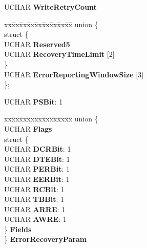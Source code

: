 \begin{DoxyCompactItemize}
\begin{tabbing}
\end{tabbing}\item 
\mbox{\label{struct___m_o_d_e___r_e_a_d___w_r_i_t_e___r_e_c_o_v_e_r_y___p_a_g_e_a5112a2ca024890a2349ff08da6f1f103}} 
U\+C\+H\+AR {\bfseries Write\+Retry\+Count}
\item 
\mbox{\label{struct___m_o_d_e___r_e_a_d___w_r_i_t_e___r_e_c_o_v_e_r_y___p_a_g_e_ad70403285bb29bef035b304ec6ccc8e0}} 
\begin{tabbing}
xx\=xx\=xx\=xx\=xx\=xx\=xx\=xx\=xx\=\kill
union \{\\
\mbox{\label{union___m_o_d_e___r_e_a_d___w_r_i_t_e___r_e_c_o_v_e_r_y___p_a_g_e_1_1_0D821_acb6b2ba36387f3955160e065796a3cb8}} 
\>struct \{\\
\>\>UCHAR {\bfseries Reserved5}\\
\>\>UCHAR {\bfseries RecoveryTimeLimit} \mbox{[}2\mbox{]}\\
\>\} \\
\>UCHAR {\bfseries ErrorReportingWindowSize} \mbox{[}3\mbox{]}\\
\}; \\

\end{tabbing}\item 
\mbox{\label{struct___m_o_d_e___r_e_a_d___w_r_i_t_e___r_e_c_o_v_e_r_y___p_a_g_e_a39bd411953e090b2c9be3395ef50bc48}} 
U\+C\+H\+AR {\bfseries P\+S\+Bit}\+: 1
\item 
\mbox{\label{struct___m_o_d_e___r_e_a_d___w_r_i_t_e___r_e_c_o_v_e_r_y___p_a_g_e_a85594bc20413f27b024c1a38e7fbdcdd}} 
\begin{tabbing}
xx\=xx\=xx\=xx\=xx\=xx\=xx\=xx\=xx\=\kill
union \{\\
\>UCHAR {\bfseries Flags}\\
\>struct \{\\
\>\>UCHAR {\bfseries DCRBit}: 1\\
\>\>UCHAR {\bfseries DTEBit}: 1\\
\>\>UCHAR {\bfseries PERBit}: 1\\
\>\>UCHAR {\bfseries EERBit}: 1\\
\>\>UCHAR {\bfseries RCBit}: 1\\
\>\>UCHAR {\bfseries TBBit}: 1\\
\>\>UCHAR {\bfseries ARRE}: 1\\
\>\>UCHAR {\bfseries AWRE}: 1\\
\>\} {\bfseries Fields}\\
\} {\bfseries ErrorRecoveryParam}\\


\end{tabbing}
\end{DoxyCompactItemize}
